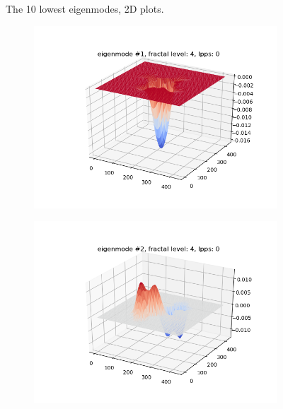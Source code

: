 \documentclass{article}
\begin{document}
\begin{figure}
\begin{subfigure}{0.3\textwidth}
    \end{subfigure}
    \caption{The 10 lowest eigenmodes, 2D plots.}
    \label{2dmodes}
\end{figure}

\begin{figure}
    \begin{subfigure}{0.3\textwidth}
        \includegraphics[width=\linewidth]{../figs/eigenmode_3d1.png}
    \end{subfigure}
    \begin{subfigure}{0.3\textwidth}
        \includegraphics[width=\linewidth]{../figs/eigenmode_3d2.png}
    \end{subfigure}
    \begin{subfigure}{0.3\textwidth}

\end{subfigure}
\end{figure}
\end{document}
